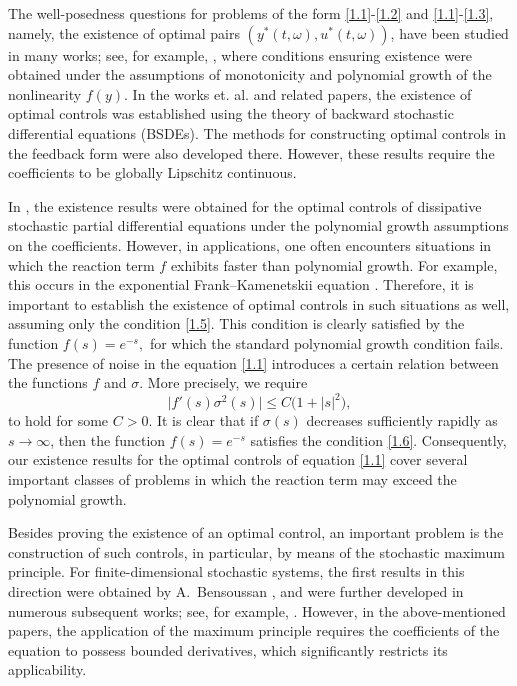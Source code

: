 \documentclass[a4paper,12pt]{article}
\numberwithin{equation}{section}
\begin{document}
The well-posedness questions for problems of the form \eqref{1.1}-\eqref{1.2} and \eqref{1.1}-\eqref{1.3}, namely, the existence of
optimal pairs $(y^*(t,\omega),u^*(t,\omega))$, have been studied in
many works; see, for example, \cite{1,3}, where conditions ensuring
existence were obtained under the assumptions of monotonicity and polynomial growth of the
nonlinearity $f(y)$. In the works \cite{4,5,6} et. al. and related papers, the existence
of optimal controls was established using the theory of backward
stochastic differential equations (BSDEs). The methods for constructing
optimal controls in the feedback form were also developed there. However,
these results require the coefficients to be globally Lipschitz continuous.

In \cite{7,8}, the existence results were obtained for the optimal controls
of dissipative stochastic partial differential equations under the
polynomial growth assumptions on the coefficients. However, in applications, one often encounters situations in which
the reaction term $f$ exhibits faster than polynomial growth.
For example, this occurs in the exponential Frank--Kamenetskii
equation \cite{9}. Therefore, it is important to establish the
existence of optimal controls in such situations as well, assuming
only the condition \eqref{1.5}. This condition is clearly satisfied by the function
$f(s)=e^{-s},$ for which the standard polynomial growth condition fails. The presence of noise in the equation \eqref{1.1} introduces a
certain relation between the functions $f$ and
$\sigma$. More precisely, we require 
\begin{equation}
\bigl|f'(s)\sigma^{2}(s)\bigr|
\le
C\bigl(1+|s|^{2}\bigr),
\label{1.6}
\end{equation}
to hold for some $C>0$. It is clear that if $\sigma(s)$ decreases sufficiently rapidly as
$s\to\infty$, then the function $f(s)=e^{-s}$ satisfies the condition
\eqref{1.6}. Consequently, our existence results for the optimal controls of
equation \eqref{1.1} cover several important classes of problems in
which the reaction term may exceed the polynomial
growth.

Besides proving the existence of an optimal control, an important
problem is the construction of such controls, in particular, by means
of the stochastic maximum principle. For finite-dimensional stochastic systems, the first results in this
direction were obtained by A.~Bensoussan \cite{10}, and were further
developed in numerous subsequent works; see, for example,
\cite{11,12,13,14,15}.
However, in the above-mentioned papers, the application of the
maximum principle requires the coefficients of the equation to possess
bounded derivatives, which significantly restricts its applicability.
\end{document}
